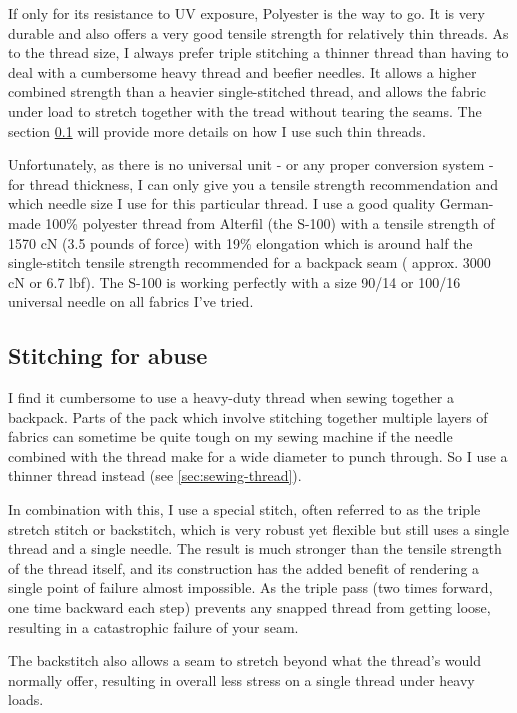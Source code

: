 If only for its resistance to UV exposure, Polyester is the way to go. It is very durable and also offers a very good tensile strength for relatively thin threads. As to the thread size, I always prefer triple stitching a thinner thread than having to deal with a cumbersome heavy thread and beefier needles. It allows a higher combined strength than a heavier single-stitched thread, and allows the fabric under load to stretch together with the tread without tearing the seams. The section \ref{sec:stitching-for-abuse} will provide more details on how I use such thin threads.

Unfortunately, as there is no universal unit - or any proper conversion system - for thread thickness, I can only give you a tensile strength recommendation and which needle size I use for this particular thread. I use a good quality German-made 100\% polyester thread from Alterfil (the S-100) with a tensile strength of 1570 cN (3.5 pounds of force) with 19\% elongation which is around half the single-stitch tensile strength recommended for a backpack seam ( approx. 3000 cN or 6.7 lbf). The S-100 is working perfectly with a size 90/14 or 100/16 universal needle on all fabrics I've tried.



\subsection{Stitching for abuse} \label{sec:stitching-for-abuse}

I find it cumbersome to use a heavy-duty thread when sewing together a backpack. Parts of the pack which involve stitching together multiple layers of fabrics can sometime be quite tough on my sewing machine if the needle combined with the thread make for a wide diameter to punch through. So I use a thinner thread instead (see \ref{sec:sewing-thread}).

In combination with this, I use a special stitch, often referred to as the triple stretch stitch or backstitch, which is very robust yet flexible but still uses a single thread and a single needle. The result is much stronger than the tensile strength of the thread itself, and its construction has the added benefit of rendering a single point of failure almost impossible. As the triple pass (two times forward, one time backward each step) prevents any snapped thread from getting loose, resulting in a catastrophic failure of your seam.

The backstitch also allows a seam to stretch beyond what the thread's would normally offer, resulting in overall less stress on a single thread under heavy loads.
